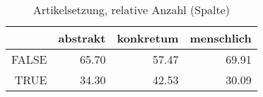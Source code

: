 \begin{table}[ht]
\centering
\begin{tabular}{rrrr}
  \hline
 & abstrakt & konkretum & menschlich \\ 
  \hline
FALSE & 65.70 & 57.47 & 69.91 \\ 
  TRUE & 34.30 & 42.53 & 30.09 \\ 
   \hline
\end{tabular}
\caption{Artikelsetzung, relative Anzahl (Spalte)} 
\end{table}
